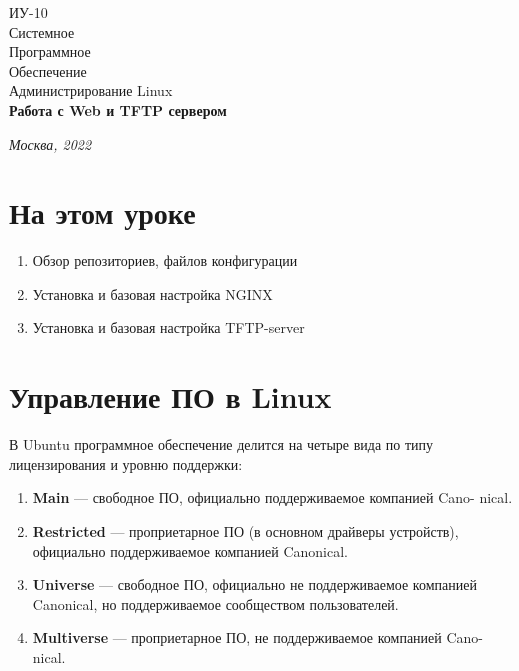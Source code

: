 \documentclass[14pt, a4paper]{article}
\begin{document}
\begin{titlepage}
    \topmargin=216pt
    \newpage
    \hangindent=0.7cm
    \huge ИУ-10\\
    Системное\\
    Программное\\
    Обеспечение\\
    Администрирование Linux\\
    \textbf{Работа с Web и TFTP сервером}

    \vspace{10cm}

    \begin{center}
        \small\textit{Москва, 2022}
    \end{center}
\end{titlepage}

\section*{На этом уроке} 

\begin{enumerate}
    \item Обзор репозиториев, файлов конфигурации
    \item Установка и базовая настройка NGINX
    \item Установка и базовая настройка TFTP-server
\end{enumerate}

\tableofcontents
\newpage


\section*{Управление ПО в Linux} 

В Ubuntu программное обеспечение делится на четыре вида по типу лицензирования и уровню
поддержки:
\begin{enumerate}
    \item \textbf{Main} — свободное ПО, официально поддерживаемое компанией Cano- nical.
    \item \textbf{Restricted} — проприетарное ПО (в основном драйверы устройств), официально
    поддерживаемое компанией Canonical.
    \item \textbf{Universe} — свободное ПО, официально не поддерживаемое компанией Canonical, но
    поддерживаемое сообществом пользователей.
    \item \textbf{Multiverse} — проприетарное ПО, не поддерживаемое компанией Cano- nical.
\end{enumerate}
\end{document}
